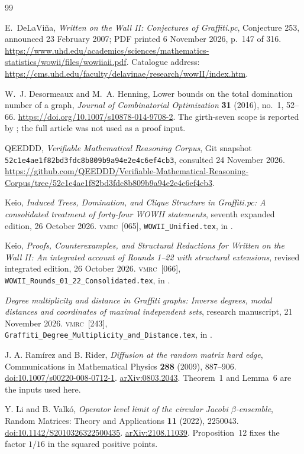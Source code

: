 \documentclass[11pt,a4paper]{article}
\theoremstyle{definition}
\theoremstyle{remark}
\newcommand{\VMRC}{\textsc{vmrc}}
\newcommand{\code}[1]{\texttt{#1}}
\begin{document}
\clearpage
\begin{thebibliography}{99}

E.~DeLaVi\~na,
\emph{Written on the Wall II: Conjectures of Graffiti.pc},
Conjecture 253, announced 23 February 2007;
PDF printed 6 November 2026,
p.~147 of 316.
\url{https://www.uhd.edu/academics/sciences/mathematics-statistics/wowii/files/wowiiaii.pdf}.
Catalogue address:
\url{https://cms.uhd.edu/faculty/delavinae/research/wowII/index.htm}.

W.~J. Desormeaux and M.~A. Henning,
Lower bounds on the total domination number of a graph,
\emph{Journal of Combinatorial Optimization}
\textbf{31} (2016), no.~1, 52--66.
\url{https://doi.org/10.1007/s10878-014-9708-2}.
The girth-seven scope is reported by \cite{wowii};
the full article was not used as a proof input.

QEEDDD,
\emph{Verifiable Mathematical Reasoning Corpus},
Git snapshot
\nolinkurl{52c1e4ae1f82bd3fdc8b809b9a94e2e4c6ef4cb3},
consulted 24 November 2026.
\url{https://github.com/QEEDDD/Verifiable-Mathematical-Reasoning-Corpus/tree/52c1e4ae1f82bd3fdc8b809b9a94e2e4c6ef4cb3}.

Keio, \emph{Induced Trees, Domination, and Clique Structure in
Graffiti.pc: A consolidated treatment of forty-four WOWII
statements}, seventh expanded edition, 26 October 2026.
\VMRC~[065], \code{WOWII\_Unified.tex}, in \cite{vmrc}.

Keio, \emph{Proofs, Counterexamples, and Structural Reductions
for Written on the Wall II: An integrated account of Rounds
1--22 with structural extensions}, revised integrated edition,
26 October 2026.
\VMRC~[066], \code{WOWII\_Rounds\_01\_22\_Consolidated.tex},
in \cite{vmrc}.

\emph{Degree multiplicity and distance in Graffiti graphs:
Inverse degrees, modal distances and coordinates of maximal
independent sets}, research manuscript, 21 November 2026.
\VMRC~[243], \code{Graffiti\_Degree\_Multiplicity\_and\_Distance.tex},
in \cite{vmrc}.


J. A. Ram\'irez and B. Rider,
\emph{Diffusion at the random matrix hard edge},
Communications in Mathematical Physics \textbf{288} (2009), 887--906.
\href{https://doi.org/10.1007/s00220-008-0712-1}{doi:10.1007/s00220-008-0712-1}.
\href{https://arxiv.org/pdf/0803.2043}{arXiv:0803.2043}.
Theorem~1 and Lemma~6 are the inputs used here.

Y. Li and B. Valk\'o,
\emph{Operator level limit of the circular Jacobi $\beta$-ensemble},
Random Matrices: Theory and Applications \textbf{11} (2022), 2250043.
\href{https://doi.org/10.1142/S2010326322500435}{doi:10.1142/S2010326322500435}.
\href{https://arxiv.org/pdf/2108.11039}{arXiv:2108.11039}.
Proposition~12 fixes the factor $1/16$ in the squared positive points.


\end{thebibliography}
\end{document}

